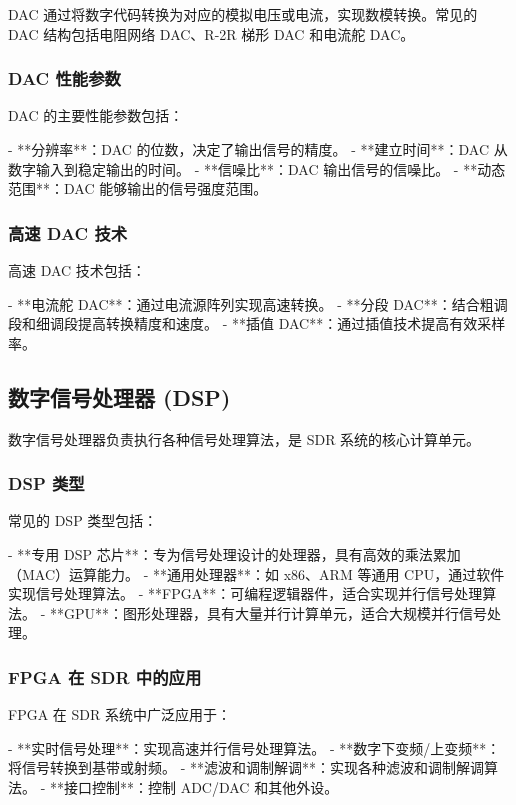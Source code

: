 \documentclass[UTF8]{ctexbook}
\begin{document}
DAC 通过将数字代码转换为对应的模拟电压或电流，实现数模转换。常见的 DAC 结构包括电阻网络 DAC、R-2R 梯形 DAC 和电流舵 DAC。

\subsubsection{DAC 性能参数}

DAC 的主要性能参数包括：

- **分辨率**：DAC 的位数，决定了输出信号的精度。
- **建立时间**：DAC 从数字输入到稳定输出的时间。
- **信噪比**：DAC 输出信号的信噪比。
- **动态范围**：DAC 能够输出的信号强度范围。

\subsubsection{高速 DAC 技术}

高速 DAC 技术包括：

- **电流舵 DAC**：通过电流源阵列实现高速转换。
- **分段 DAC**：结合粗调段和细调段提高转换精度和速度。
- **插值 DAC**：通过插值技术提高有效采样率。

\subsection{数字信号处理器 (DSP)}

数字信号处理器负责执行各种信号处理算法，是 SDR 系统的核心计算单元。

\subsubsection{DSP 类型}

常见的 DSP 类型包括：

- **专用 DSP 芯片**：专为信号处理设计的处理器，具有高效的乘法累加（MAC）运算能力。
- **通用处理器**：如 x86、ARM 等通用 CPU，通过软件实现信号处理算法。
- **FPGA**：可编程逻辑器件，适合实现并行信号处理算法。
- **GPU**：图形处理器，具有大量并行计算单元，适合大规模并行信号处理。

\subsubsection{FPGA 在 SDR 中的应用}

FPGA 在 SDR 系统中广泛应用于：

- **实时信号处理**：实现高速并行信号处理算法。
- **数字下变频/上变频**：将信号转换到基带或射频。
- **滤波和调制解调**：实现各种滤波和调制解调算法。
- **接口控制**：控制 ADC/DAC 和其他外设。
\end{document}
